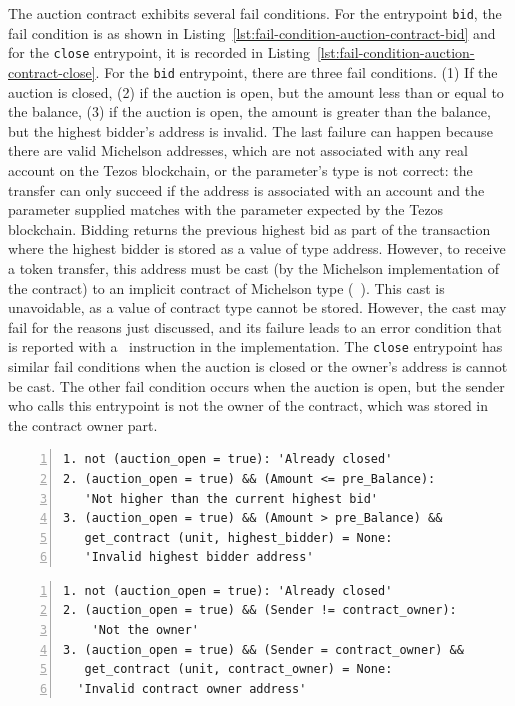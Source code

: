 \documentclass[a4paper,USenglish,cleveref, autoref,anonymous]{lipics-v2021}
\begin{document}
The auction contract exhibits several fail conditions. For the
entrypoint \lstinline/bid/, the fail condition is as shown in
Listing~\ref{lst:fail-condition-auction-contract-bid} and for the
\lstinline/close/ entrypoint, it is recorded in
Listing~\ref{lst:fail-condition-auction-contract-close}. For the
\lstinline/bid/ entrypoint, there are three fail conditions.  (1) If
the auction is closed, (2) if the auction is open, but the amount less
than or equal to the balance, (3) if the auction is open, the amount
is greater than the balance, but the highest bidder's address is
invalid. The last failure can happen because there are valid Michelson
addresses, which are not associated with any real account on the Tezos
blockchain, or the parameter's type is not correct: the transfer can
only succeed if the address is associated with an account and the
parameter supplied matches with the parameter expected by the Tezos
blockchain. Bidding returns the previous highest bid as part of the
transaction where the highest bidder is stored as a value of type
address. However, to receive a token transfer, this address must be
cast (by the Michelson implementation of the contract) to an implicit
contract of Michelson type (\TCONTRACT\ \TUNIT). This cast is
unavoidable, as a value of contract type cannot be stored.  However,
the cast may fail for the reasons just discussed, and its failure
leads to an error condition that is reported with a \FAILWITH\
instruction in the implementation. The \lstinline/close/ entrypoint has
similar fail conditions when the auction is closed or the owner's
address is cannot be cast. The other fail condition occurs when the
auction is open, but the sender who calls this entrypoint is not the
owner of the contract, which was stored in the contract owner part.

\begin{lstlisting}[float=tp,captionpos=b,caption={Fail condition for auction contract bid entrypoint },label={lst:fail-condition-auction-contract-bid},numbers=left]
1. not (auction_open = true): 'Already closed'
2. (auction_open = true) && (Amount <= pre_Balance):
   'Not higher than the current highest bid'
3. (auction_open = true) && (Amount > pre_Balance) && 
   get_contract (unit, highest_bidder) = None:
   'Invalid highest bidder address' 
\end{lstlisting}

\begin{lstlisting}[float=tp,captionpos=b,caption={Fail condition for auction contract close entrypoint},label={lst:fail-condition-auction-contract-close},numbers=left]
1. not (auction_open = true): 'Already closed'
2. (auction_open = true) && (Sender != contract_owner): 
    'Not the owner'
3. (auction_open = true) && (Sender = contract_owner) &&
   get_contract (unit, contract_owner) = None:
  'Invalid contract owner address'
\end{lstlisting}
\end{document}
